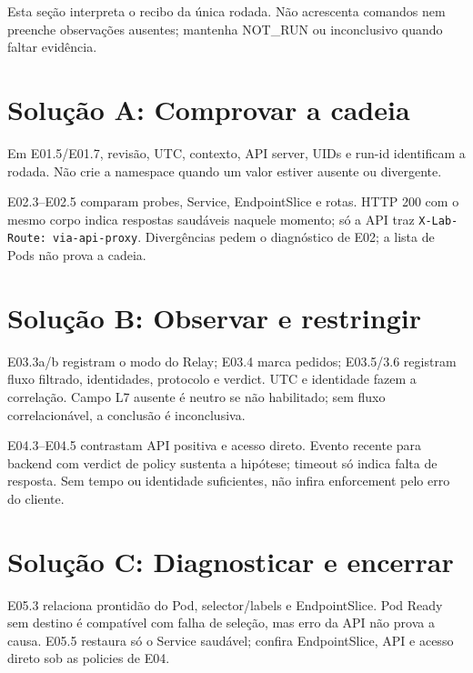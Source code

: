 \documentclass[12pt,openany,oneside,a4paper,chapter=TITLE,english,brazil]{abntex2}
\begin{document}
Esta seção interpreta o recibo da única rodada. Não acrescenta comandos nem preenche observações ausentes; mantenha NOT\_RUN ou inconclusivo quando faltar evidência.

\section*{Solução A: Comprovar a cadeia}\label{soluuxe7uxe3o-a-comprovar-a-cadeia}

Em E01.5/E01.7, revisão, UTC, contexto, API server, UIDs e run-id identificam a rodada. Não crie a namespace quando um valor estiver ausente ou divergente.

E02.3--E02.5 comparam probes, Service, EndpointSlice e rotas. HTTP 200 com o mesmo corpo indica respostas saudáveis naquele momento; só a API traz \texttt{X-{}\allowbreak{}Lab-{}\allowbreak{}Route:\allowbreak{} via-{}\allowbreak{}api-{}\allowbreak{}proxy}. Divergências pedem o diagnóstico de E02; a lista de Pods não prova a cadeia.

\section*{Solução B: Observar e restringir}\label{soluuxe7uxe3o-b-observar-e-restringir}

E03.3a/b registram o modo do Relay; E03.4 marca pedidos; E03.5/3.6 registram fluxo filtrado, identidades, protocolo e verdict. UTC e identidade fazem a correlação. Campo L7 ausente é neutro se não habilitado; sem fluxo correlacionável, a conclusão é inconclusiva.

E04.3--E04.5 contrastam API positiva e acesso direto. Evento recente para backend com verdict de policy sustenta a hipótese; timeout só indica falta de resposta. Sem tempo ou identidade suficientes, não infira enforcement pelo erro do cliente.

\section*{Solução C: Diagnosticar e encerrar}\label{soluuxe7uxe3o-c-diagnosticar-e-encerrar}

E05.3 relaciona prontidão do Pod, selector/labels e EndpointSlice. Pod Ready sem destino é compatível com falha de seleção, mas erro da API não prova a causa. E05.5 restaura só o Service saudável; confira EndpointSlice, API e acesso direto sob as policies de E04.
\end{document}
